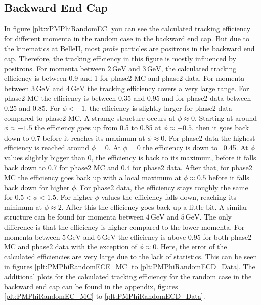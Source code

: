 \documentclass[a4paper,11pt,twosided,final,german,openbib,pdftex,listof=totoc,bibliography=totoc]{scrbook}
\begin{document}
\newpage
\subsection{Backward End Cap}
\label{sec:MEC}

In figure \ref{plt:xPMPhiRandomEC} you can see the calculated tracking efficiency for different momenta in the random case in the backward end cap. But due to the kinematics at BelleII, most \textit{probe} particles are positrons in the backward end cap. Therefore, the tracking efficiency in this figure is mostly influenced by positrons. For momenta between $2\,\textrm{GeV}$ and $3\,\textrm{GeV}$, the calculated tracking efficiency is between 0.9 and 1 for phase2 MC and phase2 data. 
For momenta between $3\,\textrm{GeV}$ and $4\,\textrm{GeV}$ the tracking efficiency covers a very large range. For phase2 MC the efficiency is between 0.35 and 0.95 and for phase2 data between 0.25 and 0.85. For $\phi <  -1$, the efficiency is slightly larger for phase2 data compared to phase2 MC. A strange structure occurs at $\phi \approx 0$. Starting at around $\phi \approx -1.5$ the efficiency goes up from 0.5 to 0.85 at $\phi \approx -0.5$, then it goes back down to 0.7 before it reaches its maximum at $\phi \approx 0$. For phase2 data the highest efficiency is reached around $\phi =0$. At $\phi =0$ the efficiency is down to ~0.45. At $\phi$ values slightly bigger than 0, the efficiency is back to its maximum, before it falls back down to 0.7 for phase2 MC and 0.4 for phase2 data. After that, for phase2 MC the efficiency goes back up with a local maximum at $\phi \approx 0.5$ before it falls back down for higher $\phi$. For phase2 data, the efficiency stays roughly the same for $0.5 < \phi < 1.5$. For higher $\phi$ values the efficiency falls down, reaching its minimum at $\phi \approx 2$. After this the efficiency goes back up a little bit. A similar structure can be found for momenta between $4\,\textrm{GeV}$ and $5\,\textrm{GeV}$. The only difference is that the efficiency is higher compared to the lower momenta. For momenta between $5\,\textrm{GeV}$ and $6\,\textrm{GeV}$ the efficiency is above 0.95 for both phase2 MC and phase2 data with the exception of $\phi \approx 0$. Here, the error of the calculated efficiencies are very large due to the lack of statistics. This can be seen in figures \ref{plt:PMPhiRandomECE_MC} to \ref{plt:PMPhiRandomECD_Data}. The additional plots for the calculated tracking efficiency for the random case in the backward end cap can be found in the appendix, figures \ref{plt:PMPhiRandomEC_MC} to \ref{plt:PMPhiRandomECD_Data}.
\end{document}

